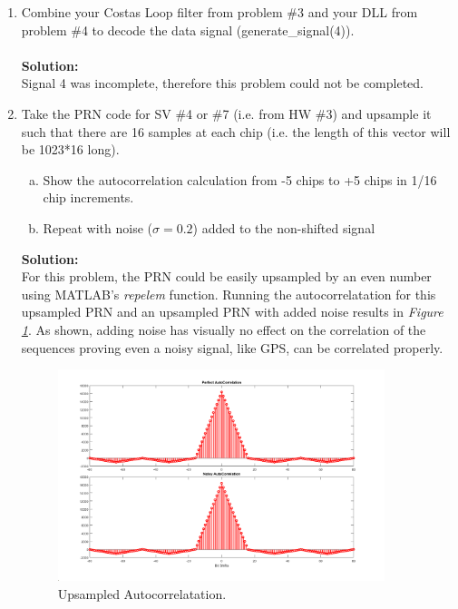 \documentclass[10pt]{article}
\newcommand{\solution}{\textbf{Solution: \\}}
\begin{document}
\begin{enumerate}[label=\textbf{\arabic*.}]
  \item Combine your Costas Loop filter from problem \#3 and your DLL from 
  problem \#4 to decode the data signal (generate\_signal(4)). \\ \\
  \solution
  \vspace{12pt}
  Signal 4 was incomplete, therefore this problem could not be completed.


  \item Take the PRN code for SV \#4 or \#7 (i.e. from HW \#3) and upsample it 
  such that there are 16 samples at each chip (i.e. the length of this vector 
  will be 1023*16 long).
  \begin{enumerate}[(a)]
    \itemsep -2pt
    \item Show the autocorrelation calculation from -5 chips to +5 chips in 
    1/16 chip increments.
    \item Repeat with noise ($\sigma=0.2$) added to the non-shifted signal
  \end{enumerate}
  \solution
  For this problem, the PRN could be easily upsampled by an even number using 
  MATLAB's \emph{repelem} function. Running the autocorrelatation for this 
  upsampled PRN and an upsampled PRN with added noise results in \emph{Figure 
  \ref{fig:8}}. As shown, adding noise has visually no effect on the correlation 
  of the sequences proving even a noisy signal, like GPS, can be correlated 
  properly.
  \begin{figure}[H]
    \centering
    \includegraphics[width=0.9\textwidth]{p6_corr.png}
    \caption{Upsampled Autocorrelatation.}
    \label{fig:8}
  \end{figure}
  \vspace{12pt}



\end{enumerate}
\end{document}
